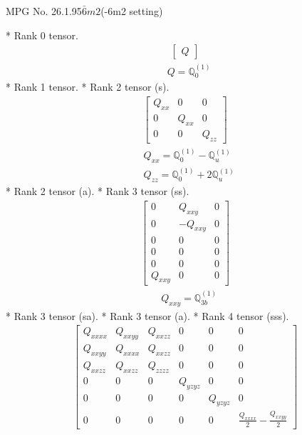 \documentclass[fleqn,8pt,landscape]{jsarticle}
\begin{document}
\setcounter{MaxMatrixCols}{32}

\renewcommand{\tablename}{Table~}
\renewcommand{\figurename}{Figure~}
\begin{center}
\LARGE
MPG No. 26.1.95\quad$\bar{6}m2$\quad(-6m2 setting)
\end{center}
* Rank 0 tensor.
\begin{align*}
\begin{bmatrix} Q \end{bmatrix}
\end{align*}
\begin{align*}
& Q = \mathbb{Q}_{0}^{(1)}
\end{align*}
* Rank 1 tensor.
* Rank 2 tensor (s).
\begin{align*}
\begin{bmatrix} Q_{xx} & 0 & 0 \\ 0 & Q_{xx} & 0 \\ 0 & 0 & Q_{zz} \end{bmatrix}
\end{align*}
\begin{align*}
& Q_{xx} = \mathbb{Q}_{0}^{(1)} - \mathbb{Q}_{u}^{(1)} \\
& Q_{zz} = \mathbb{Q}_{0}^{(1)} + 2 \mathbb{Q}_{u}^{(1)}
\end{align*}
* Rank 2 tensor (a).
* Rank 3 tensor (ss).
\begin{align*}
\begin{bmatrix} 0 & Q_{xxy} & 0 \\ 0 & - Q_{xxy} & 0 \\ 0 & 0 & 0 \\ 0 & 0 & 0 \\ 0 & 0 & 0 \\ Q_{xxy} & 0 & 0 \end{bmatrix}
\end{align*}
\begin{align*}
& Q_{xxy} = \mathbb{Q}_{3b}^{(1)}
\end{align*}
* Rank 3 tensor (sa).
* Rank 3 tensor (a).
* Rank 4 tensor (sss).
\begin{align*}
\begin{bmatrix} Q_{xxxx} & Q_{xxyy} & Q_{xxzz} & 0 & 0 & 0 \\ Q_{xxyy} & Q_{xxxx} & Q_{xxzz} & 0 & 0 & 0 \\ Q_{xxzz} & Q_{xxzz} & Q_{zzzz} & 0 & 0 & 0 \\ 0 & 0 & 0 & Q_{yzyz} & 0 & 0 \\ 0 & 0 & 0 & 0 & Q_{yzyz} & 0 \\ 0 & 0 & 0 & 0 & 0 & \frac{Q_{xxxx}}{2} - \frac{Q_{xxyy}}{2} \end{bmatrix}
\end{align*}
\end{document}
